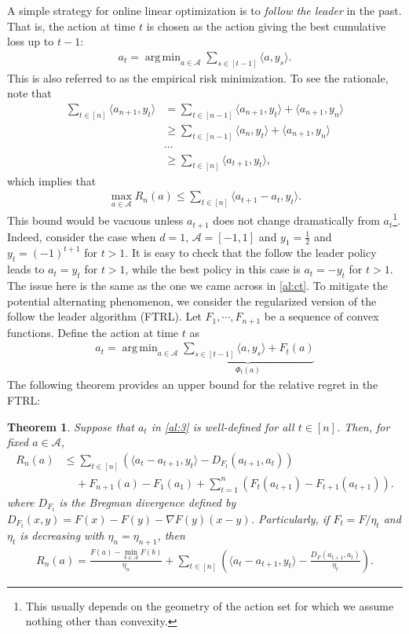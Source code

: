 \documentclass[letterpaper,11pt,openright,openany]{book}
\numberwithin{equation}{section}
\theoremstyle{plain}
\newtheorem{Th}{Theorem}[section]
\theoremstyle{definition}
\DeclareMathOperator*{\argmin}{arg\,min}
\begin{document}
A simple strategy for online linear optimization is to \emph{follow the leader} in the past. That is, the action at time $t$ is chosen as the action giving the best cumulative loss up to $t-1$: 
\begin{align*}
a_{t}=\argmin_{a\in\mathcal A}\sum_{s\in [t-1]}\langle a, y_s\rangle.
\end{align*}
This is also referred to as the empirical risk minimization. To see the rationale, note that
\begin{align*}
\sum_{t\in [n]}\langle a_{n+1}, y_t\rangle&=\sum_{t\in [n-1]}\langle a_{n+1}, y_t\rangle+\langle a_{n+1}, y_n\rangle\\
&\geq \sum_{t\in [n-1]}\langle a_{n}, y_t\rangle+\langle a_{n+1}, y_n\rangle\\
&\cdots\\
&\geq \sum_{t\in [n]}\langle a_{t+1}, y_t\rangle,
\end{align*}
which implies that
\begin{align*}
\max_{a\in\mathcal A}R_{n}(a)\leq\sum_{t\in [n]}\langle a_{t+1}-a_t, y_t\rangle.
\end{align*}
This bound would be vacuous unless $a_{t+1}$ does not change dramatically from $a_t$\footnote{This usually depends on the geometry of the action set for which we assume nothing other than convexity.}. Indeed, consider the case when $d=1$, $\mathcal A = [-1,1]$ and $y_1=\frac{1}{2}$ and $y_t = (-1)^{t+1}$ for $t> 1$. It is easy to check that the follow the leader policy leads to $a_t = y_t$ for $t>1$, while the best policy in this case is $a_t = -y_t$ for $t>1$. The issue here is the same as the one we came across in \eqref{al:ct}. To mitigate the potential alternating phenomenon, we consider the regularized version of the follow the leader algorithm (FTRL). Let $F_1, \cdots, F_{n+1}$ be a sequence of convex functions. Define the action at time $t$ as 
\begin{align}
a_t=\argmin_{a\in\mathcal A}\underbrace{\sum_{s\in [t-1]}\langle a, y_s\rangle+F_t(a)}_{\Phi_t(a)}\label{al:3}
\end{align}  
The following theorem provides an upper bound for the relative regret in the FTRL:
\begin{Th}\label{al:FTRL}
Suppose that $a_t$ in \eqref{al:3} is well-defined for all $t\in [n]$. Then, for fixed $a\in\mathcal A$,  
\begin{align*}
R_n(a)&\leq \sum_{t\in [n]}\left(\langle a_t-a_{t+1},y_t\rangle-D_{F_t}(a_{t+1}, a_t)\right)\\
&\ \ \ \ \ +F_{n+1}(a)-F_1(a_1)+\sum_{t=1}^n\left(F_t(a_{t+1})-F_{t+1}(a_{t+1})\right).
\end{align*}
where $D_{F_t}$ is the Bregman divergence defined by $D_{F_t}(x,y)=F(x)-F(y)-\nabla F(y)(x-y)$. Particularly, if $F_t = F/\eta_t$ and $\eta_t$ is decreasing with $\eta_n=\eta_{n+1}$, then
\begin{align*}
R_n(a)=\frac{F(a)-\min_{b\in\mathcal A}F(b)}{\eta_n}+\sum_{t\in [n]}\left(\langle a_t- a_{t+1}, y_t\rangle-\frac{D_F(a_{t+1}, a_t)}{\eta_t}\right).
\end{align*}
\end{Th}
\end{document}
